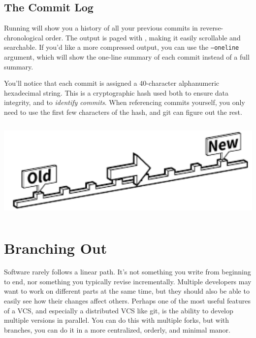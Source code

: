 \documentclass[11pt,letterpaper,twoside]{report}
\begin{document}
\section{The Commit Log}

Running  will show you a history of all your previous commits in
reverse-chronological order. The output is paged with , making it
easily scrollable and searchable. If you'd like a more compressed output, you
can use the \texttt{--oneline} argument, which will show the one-line summary of
each commit instead of a full summary.

You'll notice that each commit is assigned a 40-character alphanumeric
hexadecimal string. This is a cryptographic hash used both to ensure data
integrity, and to \emph{identify commits}. When referencing commits yourself,
you only need to use the first few characters of the hash, and git can figure
out the rest.

\vspace{\fill}
\begin{center}
\includegraphics[height=5cm]{resources/timeline_abstract.pdf}
\end{center}
\vspace*{\fill}

\chapter{Branching Out}

Software rarely follows a linear path. It's not something you write from
beginning to end, nor something you typically revise incrementally. Multiple
developers may want to work on different parts at the same time, but they should
also be able to easily see how their changes affect others. Perhaps one of the
most useful features of a VCS, and especially a distributed VCS like git, is the
ability to develop multiple versions in parallel. You can do this with multiple
forks, but with branches, you can do it in a more centralized, orderly, and
minimal manor.
\end{document}
